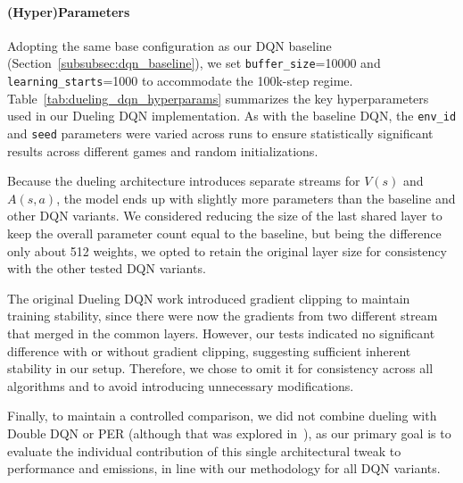 \paragraph{(Hyper)Parameters}
Adopting the same base configuration as our DQN baseline (Section~\ref{subsubsec:dqn_baseline}), we set 
\texttt{buffer\_size}=\num{10000} and \texttt{learning\_starts}=\num{1000} to accommodate the 100k-step regime. 
Table~\ref{tab:dueling_dqn_hyperparams} summarizes the key hyperparameters used in our Dueling DQN implementation. As with the baseline DQN, the \texttt{env\_id} and \texttt{seed} parameters were varied across runs to ensure statistically significant results across different games and random initializations.

Because the dueling architecture introduces separate streams for $V(s)$ and $A(s,a)$, the model ends up
with slightly more parameters than the baseline and other DQN variants. We considered reducing the size of the last shared layer to keep the
overall parameter count equal to the baseline, but being the difference only about 512 weights,
we opted to retain the original layer size for consistency with the other tested DQN variants.

The original Dueling DQN work introduced gradient clipping to maintain training stability, since there were now the gradients from two different stream
that merged in the common layers. However, our tests indicated no significant difference with or without gradient clipping, suggesting sufficient inherent stability in our setup. Therefore, we chose to omit it for consistency across all algorithms and to avoid introducing unnecessary modifications.

Finally, to maintain a controlled comparison, we did not combine dueling with Double DQN or PER (although that was explored in~\cite{wang:dueling}), as our primary goal is to evaluate the individual contribution of this single architectural tweak to performance and emissions, in line with our methodology for all DQN variants.

